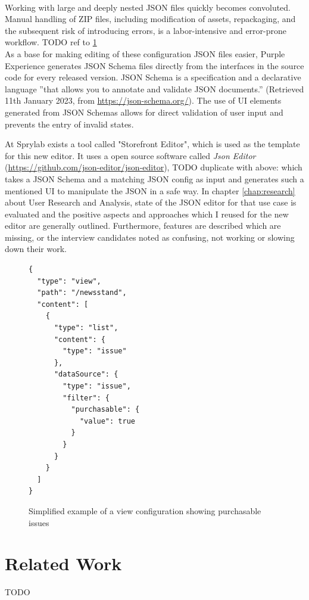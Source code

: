 \\
Working with large and deeply nested JSON files quickly becomes convoluted.
Manual handling of ZIP files, including modification of assets, repackaging, and the subsequent risk of introducing errors, is a labor-intensive and error-prone workflow.
TODO ref to \ref{fig:viewexample}
\\
As a base for making editing of these configuration JSON files easier, Purple Experience generates JSON Schema files directly from the interfaces in the source code for every released version.
JSON Schema is a specification and a declarative language ''that allows you to annotate and validate JSON documents.'' (Retrieved 11th January 2023, from \url{https://json-schema.org/}).
The use of UI elements generated from JSON Schemas allows for direct validation of user input and prevents the entry of invalid states.

At Sprylab exists a tool called "Storefront Editor", which is used as the template for this new editor.
It uses a open source software called \textit{Json Editor} (\url{https://github.com/json-editor/json-editor}), TODO duplicate with above: which takes a JSON Schema and a matching JSON config as input and generates such a mentioned UI to manipulate the JSON in a safe way.
In chapter \ref{chap:research} about User Research and Analysis, state of the JSON editor for that use case is evaluated and the positive aspects and approaches which I reused for the new editor are generally outlined.
Furthermore, features are described which are missing, or the interview candidates noted as confusing, not working or slowing down their work.

\begin{figure}
  \lstset{language=json,basicstyle=\footnotesize,numbers=left,showstringspaces=false,frame=single}
  \begin{lstlisting}
{
  "type": "view",
  "path": "/newsstand",
  "content": [
    {
      "type": "list",
      "content": {
        "type": "issue"
      },
      "dataSource": {
        "type": "issue",
        "filter": {
          "purchasable": {
            "value": true
          }
        }
      }
    }
  ]
}
  \end{lstlisting}
  \caption{Simplified example of a view configuration showing purchasable issues}
  \label{fig:viewexample}
\end{figure}

\section{Related Work}

TODO
